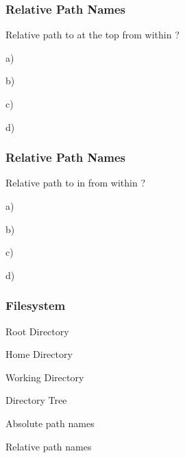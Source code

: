 \documentclass[12pt]{beamer}\usepackage[]{graphicx}\usepackage[]{color}
\begin{document}

\begin{frame}[fragile]
\frametitle{Relative Path Names}
\begin{center}
\end{center}

Relative path to  at the top from within ?
\bi
  \item[a)] 
  \item[b)] 
  \item[c)] 
  \item[d)] 
\ei

\end{frame}


\begin{frame}[fragile]
\frametitle{Relative Path Names}
\begin{center}
\end{center}

Relative path to  in  from within ?
\bi
  \item[a)] 
  \item[b)] 
  \item[c)] 
  \item[d)] 
\ei

\end{frame}


\begin{frame}
\frametitle{Filesystem}
\bi
  \item Root Directory
  \item Home Directory
  \item Working Directory
  \item Directory Tree
  \item Absolute path names
  \item Relative path names
\ei
\end{frame}


\begin{frame}
\begin{center}
\Huge{}
\end{center}
\end{frame}
\end{document}
